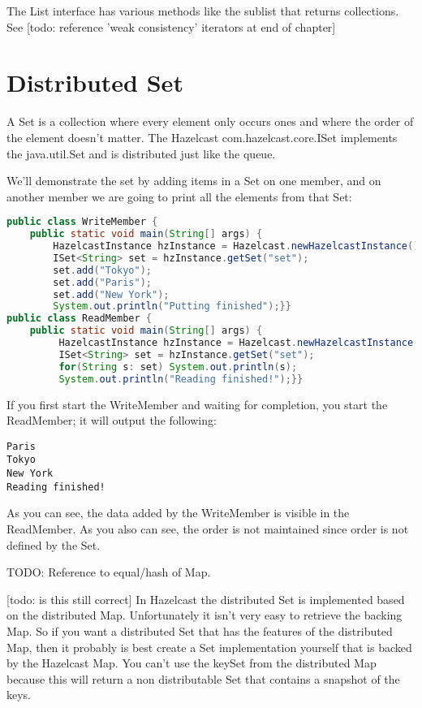 The List interface has various methods like the sublist that returns collections. See [todo: reference 'weak consistency' iterators at end of chapter]

\section{Distributed Set}
A Set is a collection where every element only occurs ones and where the order of the element doesn't matter. The Hazelcast com.hazelcast.core.ISet implements the java.util.Set and is distributed just like the queue.

We'll demonstrate the set by adding items in a Set on one member, and on another member we are going to print all the elements from that Set:
\begin{lstlisting}[language=java]
public class WriteMember {
    public static void main(String[] args) {
        HazelcastInstance hzInstance = Hazelcast.newHazelcastInstance();
        ISet<String> set = hzInstance.getSet("set");
        set.add("Tokyo");
        set.add("Paris");
        set.add("New York");
        System.out.println("Putting finished");}}
public class ReadMember {
    public static void main(String[] args) {
         HazelcastInstance hzInstance = Hazelcast.newHazelcastInstance();
         ISet<String> set = hzInstance.getSet("set");
         for(String s: set) System.out.println(s);
         System.out.println("Reading finished!");}}
\end{lstlisting}
If you first start the WriteMember and waiting for completion, you start the ReadMember; it will output the following:
\begin{lstlisting}
Paris
Tokyo
New York
Reading finished!	
\end{lstlisting}
As you can see, the data added by the WriteMember is visible in the ReadMember. As you also can see, the order is not maintained since order is not defined by the Set.

TODO: Reference to equal/hash of Map.

[todo: is this still correct]
In Hazelcast the distributed Set is implemented based on the distributed Map. Unfortunately it isn't very easy to retrieve the backing Map. So if you want a distributed Set that has the features of the distributed Map, then it probably is best create a Set implementation yourself that is backed by the Hazelcast Map. You can't use the keySet from the distributed Map because this will return a non distributable Set that contains a snapshot of the keys.

